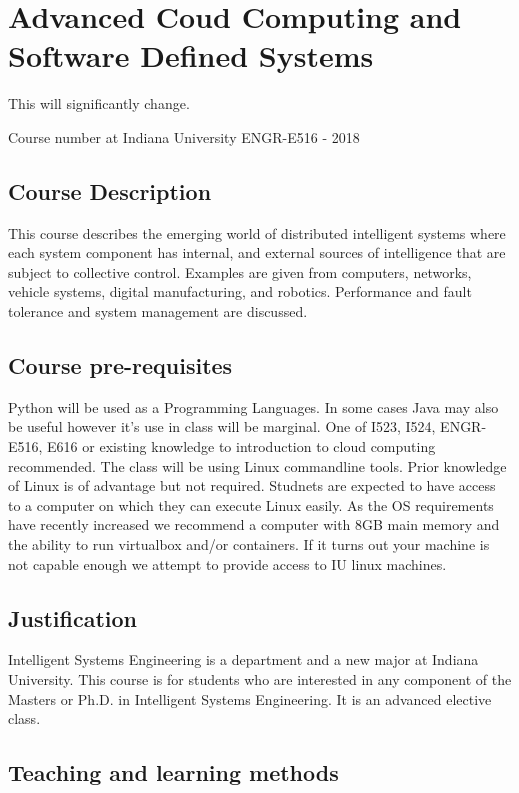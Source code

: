 \CHANGE
\FILENAME

\section{Advanced Coud Computing and Software Defined Systems}

This will significantly change.

Course number at Indiana University ENGR-E516 - 2018

\subsection{Course Description}

This course describes the emerging world of distributed intelligent
systems where each system component has internal, and external sources
of intelligence that are subject to collective control. Examples are
given from computers, networks, vehicle systems, digital
manufacturing, and robotics. Performance and fault tolerance and
system management are discussed.

\subsection{Course pre-requisites}

Python will be used as a Programming Languages. In some cases Java may
also be useful however it's use in class will be marginal. One of
I523, I524, ENGR-E516, E616 or existing knowledge to introduction to
cloud computing recommended. The class will be using Linux commandline
tools. Prior knowledge of Linux is of advantage but not required.
Studnets are expected to have access to a computer on which they can
execute Linux easily. As the OS requirements have recently increased
we recommend a computer with 8GB main memory and the ability to run
virtualbox and/or containers. If it turns out your machine is not
capable enough we attempt to provide access to IU linux machines.

\subsection{Justification}

Intelligent Systems Engineering is a department and a new major at
Indiana University. This course is for students who are interested in
any component of the Masters or Ph.D. in Intelligent Systems
Engineering. It is an advanced elective class.

\subsection{Teaching and learning methods}

